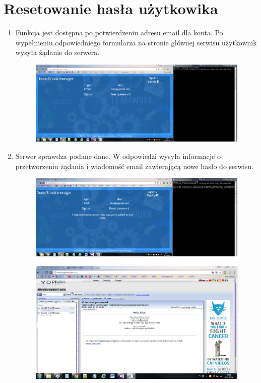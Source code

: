 \documentclass[12pt]{report}
\begin{document}
\section{Resetowanie hasła użytkowika}
\begin{enumerate}
\item Funkcja jest dostępna po potwierdzeniu adresu email dla konta. 
Po wypełnieniu odpowiedniego formularza na stronie głównej serwisu użytkownik wysyła żądanie do serwera.
\begin{figure}[h]
\centering
\includegraphics[width=\textwidth,height=\textheight,keepaspectratio]{51.png}
\end{figure}
\item Serwer sprawdza podane dane. W odpowiedzi wysyła informacje o przetworzeniu żądania i wiadomość email zawierającą nowe hasło do serwisu.
\begin{figure}[h]
\centering
\includegraphics[width=\textwidth,height=\textheight,keepaspectratio]{52.png}
\end{figure}
\begin{figure}[h]
\centering
\includegraphics[width=\textwidth,height=\textheight,keepaspectratio]{53.png}
\end{figure}
\end{enumerate}
\end{document}
